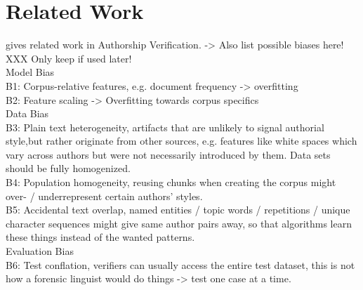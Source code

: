 \chapter{Related Work}\label{related_work}


\cite{stein2019unbiasedGutenbergCorpus} gives related work in Authorship Verification.
-> Also list possible biases here! XXX Only keep if used later!\\
Model Bias\\
B1: Corpus-relative features, e.g. document frequency -> overfitting\\
B2: Feature scaling -> Overfitting towards corpus specifics\\
Data Bias\\
B3: Plain text heterogeneity, artifacts that are unlikely to signal authorial style,but rather originate from other sources, e.g. features like white spaces which vary across authors but were not necessarily introduced by them. Data sets should be fully homogenized.\\
B4: Population homogeneity, reusing chunks when creating the corpus might over- / underrepresent certain authors' styles.\\
B5: Accidental text overlap, named entities / topic words / repetitions / unique character sequences might give same author pairs away, so that algorithms learn these things instead of the wanted patterns.\\
Evaluation Bias\\
B6: Test conflation, verifiers can usually access the entire test dataset, this is not how a forensic linguist would do things -> test one case at a time.\\

